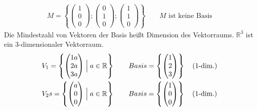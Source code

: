 \begin{gather*}
  M = \left\{\begin{pmatrix}1 \\ 0 \\ 0\end{pmatrix}; \begin{pmatrix}0 \\ 1 \\ 0\end{pmatrix}; \begin{pmatrix}1 \\ 1 \\ 0\end{pmatrix}\right\} \qquad \text{$M$ ist keine Basis}
\end{gather*}
Die Mindestzahl von Vektoren der Basis heißt Dimension des Vektorraums. $\mathbb{R}^3$ ist ein 3-dimensionaler Vektorraum.
\begin{gather*}
  V_1 = \left\{\begin{pmatrix}1a \\ 2a \\ 3a\end{pmatrix} \Bigm| a \in \mathbb{R}\right\} \qquad Basis = \left\{\begin{pmatrix}1 \\ 2 \\ 3\end{pmatrix}\right\} \quad\text{(1-dim.)} \\
  V_2s = \left\{\begin{pmatrix}a \\ 0 \\ 0\end{pmatrix} \Bigm| a \in \mathbb{R}\right\} \qquad Basis = \left\{\begin{pmatrix}1 \\ 0 \\ 0\end{pmatrix}\right\} \quad\text{(1-dim.)}
\end{gather*}
\newpage
